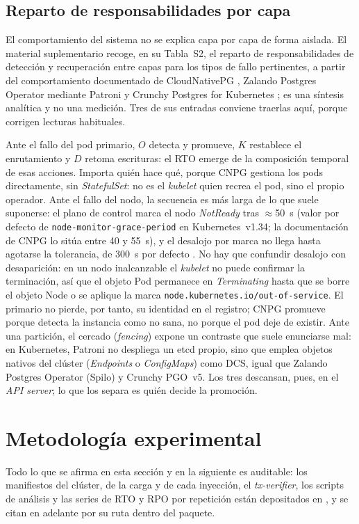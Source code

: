 \subsection{Reparto de responsabilidades por capa}\label{sec:reparto}
El comportamiento del sistema no se explica capa por capa de forma aislada. El material suplementario recoge, en su Tabla~S2, el reparto de responsabilidades de detección y recuperación entre capas para los tipos de fallo pertinentes, a partir del comportamiento documentado de CloudNativePG \citep{cnpg2026}, Zalando Postgres Operator mediante Patroni \citep{patroni2026} y Crunchy Postgres for Kubernetes \citep{crunchy2026}; es una síntesis analítica y no una medición. Tres de sus entradas conviene traerlas aquí, porque corrigen lecturas habituales.



Ante el fallo del pod primario, $O$ detecta y promueve, $K$ restablece el enrutamiento y $D$ retoma escrituras: el RTO emerge de la composición temporal de esas acciones. Importa quién hace qué, porque CNPG gestiona los pods directamente, sin \textit{StatefulSet}: no es el \textit{kubelet} quien recrea el pod, sino el propio operador. Ante el fallo del nodo, la secuencia es más larga de lo que suele suponerse: el plano de control marca el nodo \textit{NotReady} tras $\approx$50~s  (valor por defecto de \texttt{node-monitor-grace-period} en Kubernetes~v1.34; la documentación de CNPG lo sitúa entre 40 y 55~s), y el desalojo por marca no llega hasta agotarse la tolerancia, de 300~s por defecto \citep{k8s2026kcm}. No hay que confundir desalojo con desaparición: en un nodo inalcanzable el \textit{kubelet} no puede confirmar la terminación, así que el objeto Pod permanece en \textit{Terminating} hasta que se borre el objeto Node o se aplique la marca \texttt{node.kubernetes.io/\allowbreak out-of-\allowbreak service}. El primario no pierde, por tanto, su identidad en el registro; CNPG promueve porque detecta la instancia como no sana, no porque el pod deje de existir. Ante una partición, el cercado (\textit{fencing}) expone un contraste que suele enunciarse mal: en Kubernetes, Patroni no despliega un etcd propio, sino que emplea objetos nativos del clúster  (\textit{Endpoints} o \textit{ConfigMaps}) como DCS, igual que Zalando Postgres Operator (Spilo) y Crunchy PGO~v5. Los tres descansan, pues, en el \textit{API server}; lo que los separa es quién decide la promoción.


\section{Metodología experimental}\label{sec:metodo}
Todo lo que se afirma en esta sección y en la siguiente es auditable: los manifiestos del clúster, de la carga y de cada inyección, el \textit{tx-verifier}, los scripts de análisis y las series de RTO y RPO por repetición están depositados en , y se citan en adelante por su ruta dentro del paquete.

